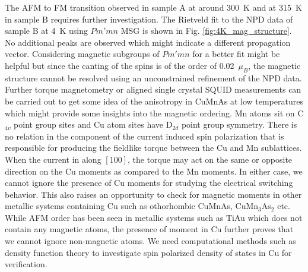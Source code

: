 \documentclass[letterpaper,10pt,doublespacing,edeposit]{uiucthesis2020}
\begin{document}
\begin{mainmatter}

The AFM to FM transition observed in sample A at around 300~K and at 315~K in sample B requires further investigation. The Rietveld fit to the NPD data of sample B at 4~K using $Pm'mn$ MSG is shown in Fig. \ref{fig:4K_mag_structure}. No additional peaks are observed which might indicate a different propagation vector. Considering magnetic subgroups of $Pm'mn$ for a better fit might be helpful but since the canting of the spins is of the order of 0.02~$\mu_B$, the magnetic structure cannot be resolved using an unconstrained refinement of the NPD data. Further torque magnetometry or aligned single crystal SQUID measurements can be carried out to get some idea of the anisotropy in CuMnAs at low temperatures which might provide some insights into the magnetic ordering. Mn atoms sit on C$_{4v}$ point group sites and Cu atom sites have D$_{2d}$ point group symmetry. There is no relation in the component of the current induced spin polarization that is responsible for producing the fieldlike torque between the Cu and Mn sublattices. When the current in along $[100]$, the torque may act on the same or opposite direction on the Cu moments as compared to the Mn moments. In either case, we cannot ignore the presence of Cu moments for studying the electrical switching behavior. This also raises an opportunity to check for magnetic moments in other metallic systems containing Cu such as othorhombic CuMnAs, CuMn$_3$As$_2$ etc. While AFM order has been seen in metallic systems such as TiAu \cite{Svanidze2015} which does not contain any magnetic atoms, the presence of moment in Cu further proves that we cannot ignore non-magnetic atoms. We need computational methods such as density function theory to investigate spin polarized density of states in Cu for verification.


\end{mainmatter}
\end{document}

